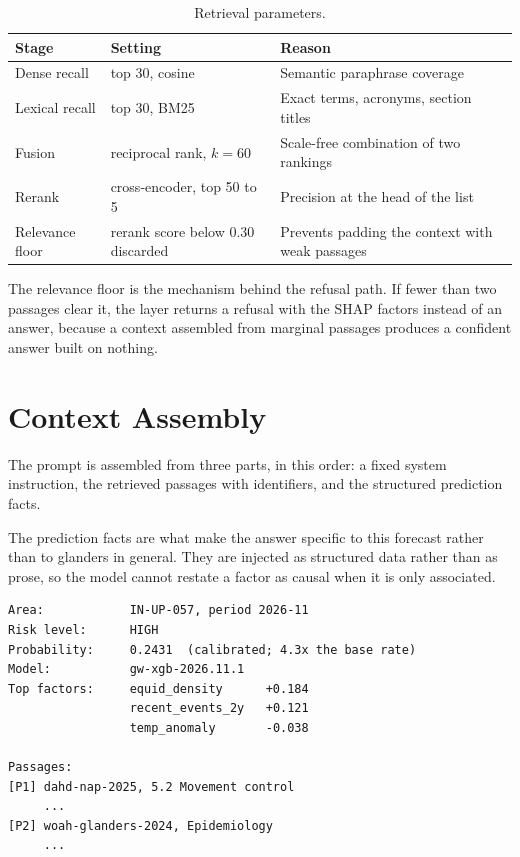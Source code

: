 \documentclass[10pt,openany]{report}
\begin{document}
\begin{table}[htbp]
\centering
\caption{Retrieval parameters.}
\label{tab:retrieval}
\small
\begin{tabular}{@{}lll@{}}
\toprule
\textbf{Stage} & \textbf{Setting} & \textbf{Reason} \\
\midrule
Dense recall & top 30, cosine & Semantic paraphrase coverage \\
Lexical recall & top 30, BM25 & Exact terms, acronyms, section titles \\
Fusion & reciprocal rank, $k=60$ & Scale-free combination of two rankings \\
Rerank & cross-encoder, top 50 to 5 & Precision at the head of the list \\
Relevance floor & rerank score below 0.30 discarded & Prevents padding the context with weak passages \\
\bottomrule
\end{tabular}
\end{table}

The relevance floor is the mechanism behind the refusal path. If fewer than two passages clear it,
the layer returns a refusal with the SHAP factors instead of an answer, because a context assembled
from marginal passages produces a confident answer built on nothing.

\section{Context Assembly}

The prompt is assembled from three parts, in this order: a fixed system instruction, the retrieved
passages with identifiers, and the structured prediction facts.

The prediction facts are what make the answer specific to this forecast rather than to glanders in
general. They are injected as structured data rather than as prose, so the model cannot restate a
factor as causal when it is only associated.

\begin{verbatim}
Area:            IN-UP-057, period 2026-11
Risk level:      HIGH
Probability:     0.2431  (calibrated; 4.3x the base rate)
Model:           gw-xgb-2026.11.1
Top factors:     equid_density      +0.184
                 recent_events_2y   +0.121
                 temp_anomaly       -0.038

Passages:
[P1] dahd-nap-2025, 5.2 Movement control
     ...
[P2] woah-glanders-2024, Epidemiology
     ...
\end{verbatim}
\end{document}
